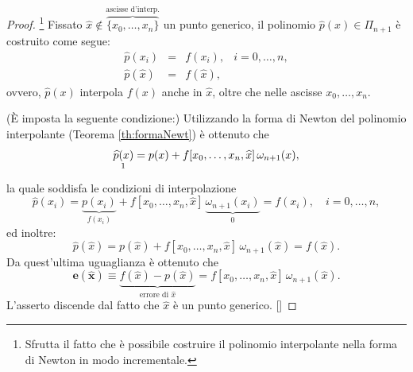 \begin{proof}
    \footnote{Sfrutta il fatto che è possibile costruire il polinomio interpolante nella forma di Newton in modo incrementale.} Fissato $\widehat x\notin\overbrace{\{x_0,\hdots,x_n\}}^{\text{ascisse d'interp.}}$ un punto generico, il polinomio $\widehat p(x)\in\Pi_{n+1}$ è costruito come segue:
    \begin{equation*}
        \begin{matrix}
            \widehat p(x_i)&=&f(x_i),& i=0,\hdots,n,\\
        \widehat p(\widehat x) &=& f(\widehat x),
        \end{matrix}
    \end{equation*}
    ovvero, $\widehat p(x)$ interpola $f(x)$ anche in $\widehat x$, oltre che nelle ascisse $x_0,\hdots,x_n$.
    
    (È imposta la seguente condizione:) Utilizzando la forma di Newton del polinomio interpolante (Teorema \ref{th:formaNewt}) è ottenuto che
    \begin{equation*}
        \underset{\footnotemark}{\widehat p(x)} = p(x) + f[x_0,\hdots,x_n,\widehat x]\,\omega_{n+1}(x),
    \end{equation*}
    la quale soddisfa le condizioni di interpolazione
    \begin{equation*}
        \widehat p(x_i)=\underbrace{p(x_i)}_{f(x_i)} + f[x_0,\hdots,x_n,\widehat x]\,\underbrace{\omega_{n+1}(x_i)}_{0} \boldsymbol = f(x_i),\quad i=0,\hdots,n,
    \end{equation*}
    ed inoltre:
    \begin{equation*}
        \widehat p(\widehat x)=p(\widehat x)+ f[x_0,\hdots,x_n,\widehat x]\,\omega_{n+1}(\widehat x)\boldsymbol = f(\widehat x).
    \end{equation*}
    Da quest'ultima uguaglianza è ottenuto che
    \begin{equation*}
        \boldsymbol{e(\widehat x)\equiv} \underbrace{f(\widehat x) - p(\widehat x)}_{\text{errore di $\widehat x$}}=f[x_0,\hdots,x_n,\widehat x]\,\omega_{n+1}(\widehat x).
    \end{equation*}
    L'asserto discende dal fatto che $\widehat x$ è un punto generico. [\footnotemark]
\end{proof}

\addtocounter{footnote}{-1}

